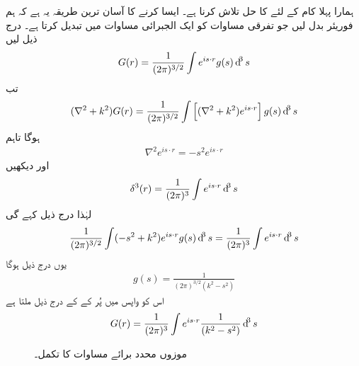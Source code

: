 ہمارا پہلا کام  کے لئے  کا حل تلاش کرنا ہے۔ ایسا کرنے کا آسان ترین طریقہ یہ ہے کہ ہم فوریئر بدل لیں جو تفرقی مساوات کو ایک الجبرائی مساوات میں تبدیل کرتا ہے۔ درج ذیل لیں
\begin{align}
	G(r)=\frac{1}{(2\pi)^{3/2}}\int e^{is\cdot r}g(s)\dif^3s
\end{align}
تب 
\begin{align*}
	(\nabla^2+k^2)G(r) = \frac{1}{(2\pi)^{3/2}}\int\left[(\nabla^2+k^2)e^{is\cdot r}\right]g(s)\dif^3s
\end{align*}
ہوگا تاہم
\begin{align}
	\nabla^2e^{is\cdot r} = -s^2 e^{is\cdot r}
\end{align}
اور  دیکھیں
\begin{align}
	\delta^3(r)=\frac{1}{(2\pi)^3}\int e^{is\cdot r}\dif^3s
\end{align}
لہٰذا  درج ذیل کہے گی
\begin{align*}
	\frac{1}{(2\pi)^{3/2}}\int(-s^2+k^2)e^{is\cdot r}g(s)\dif^3s = \frac{1}{(2\pi)^3}\int e^{is\cdot r}\dif^3s
\end{align*}
یوں درج ذیل ہوگا 
\begin{align}
	g(s) = \frac{1}{(2\pi)^{3/2}(k^2-s^2)}
\end{align}
اس کو واپس  میں پُر  کے کے درج ذیل ملتا ہے
\begin{align}\label{مساوات_بکھراو_گرین_کا_تکمل}
	G(r) = \frac{1}{(2\pi)^3}\int e^{is\cdot r}\frac{1}{(k^2-s^2)}\dif^3s
\end{align}
%
\begin{figure}
\centering
{}
\caption{موزوں محدد برائے مساوات   کا تکمل۔}
\label{شکل_بکھراو_موزوں_محدد}
\end{figure}

